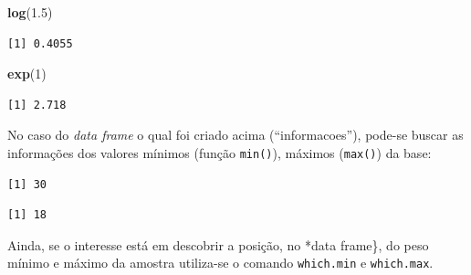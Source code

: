 \documentclass[12pt,brazil,oneside]{book}
\newenvironment{Shaded}{\begin{snugshade}}{\end{snugshade}}
\newcommand{\CommentTok}[1]{\textcolor[rgb]{0.56,0.35,0.01}{\textit{#1}}}
\newcommand{\DecValTok}[1]{\textcolor[rgb]{0.00,0.00,0.81}{#1}}
\newcommand{\FloatTok}[1]{\textcolor[rgb]{0.00,0.00,0.81}{#1}}
\newcommand{\KeywordTok}[1]{\textcolor[rgb]{0.13,0.29,0.53}{\textbf{#1}}}
\newcommand{\NormalTok}[1]{#1}
\newcommand{\OperatorTok}[1]{\textcolor[rgb]{0.81,0.36,0.00}{\textbf{#1}}}
\begin{document}
\begin{Shaded}
\begin{Highlighting}[]
\KeywordTok{log}\NormalTok{(}\FloatTok{1.5}\NormalTok{)}
\end{Highlighting}
\end{Shaded}

\begin{verbatim}
[1] 0.4055
\end{verbatim}

\begin{Shaded}
\begin{Highlighting}[]
\KeywordTok{exp}\NormalTok{(}\DecValTok{1}\NormalTok{)}
\end{Highlighting}
\end{Shaded}

\begin{verbatim}
[1] 2.718
\end{verbatim}

No caso do \emph{data frame} o qual foi criado acima (``informacoes''),
pode-se buscar as informações dos valores mínimos (função
\texttt{min()}), máximos (\texttt{max()}) da base:

\begin{Shaded}
\end{Shaded}

\begin{verbatim}
[1] 30
\end{verbatim}

\begin{Shaded}
\end{Shaded}

\begin{verbatim}
[1] 18
\end{verbatim}

Ainda, se o interesse está em descobrir a posição, no *data frame\}, do
peso mínimo e máximo da amostra utiliza-se o comando \texttt{which.min}
e \texttt{which.max}.

\begin{Shaded}
\end{Shaded}
\end{document}
